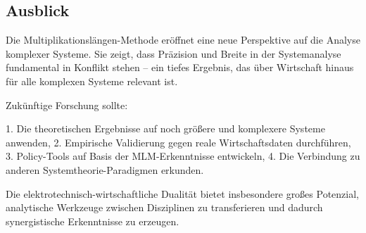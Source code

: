\documentclass[a4paper,12pt]{article}
\theoremstyle{definition}
\begin{document}
\subsection{Ausblick}

Die Multiplikationslängen-Methode eröffnet eine neue Perspektive auf die Analyse komplexer Systeme. Sie zeigt, dass Präzision und Breite in der Systemanalyse fundamental in Konflikt stehen – ein tiefes Ergebnis, das über Wirtschaft hinaus für alle komplexen Systeme relevant ist.

Zukünftige Forschung sollte:

1. Die theoretischen Ergebnisse auf noch größere und komplexere Systeme anwenden,
2. Empirische Validierung gegen reale Wirtschaftsdaten durchführen,
3. Policy-Tools auf Basis der MLM-Erkenntnisse entwickeln,
4. Die Verbindung zu anderen Systemtheorie-Paradigmen erkunden.

Die elektrotechnisch-wirtschaftliche Dualität bietet insbesondere großes Potenzial, analytische Werkzeuge zwischen Disziplinen zu transferieren und dadurch synergistische Erkenntnisse zu erzeugen.
\end{document}
